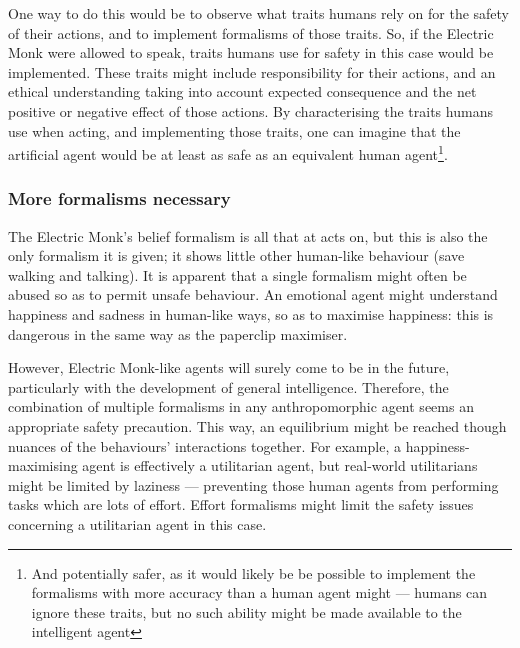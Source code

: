 One way to do this would be to observe what traits humans rely on for the safety of their actions, and to implement formalisms of those traits. So, if the Electric Monk were allowed to speak, traits humans use for safety in this case would be implemented. These traits might include responsibility for their actions, and an ethical understanding taking into account expected consequence and the net positive or negative effect of those actions. By characterising the traits humans use when acting, and implementing those traits, one can imagine that the artificial agent would be at least as safe as an equivalent human agent\footnote{And potentially safer, as it would likely be be possible to implement the formalisms with more accuracy than a human agent might --- humans can ignore these traits, but no such ability might be made available to the intelligent agent}.\par

\subsubsection{More formalisms necessary}
The Electric Monk's belief formalism is all that at acts on, but this is also the only formalism it is given; it shows little other human-like behaviour (save walking and talking). It is apparent that a single formalism might often be abused so as to permit unsafe behaviour. An emotional agent might understand happiness and sadness in human-like ways, so as to maximise happiness: this is dangerous in the same way as the paperclip maximiser.\par

However, Electric Monk-like agents will surely come to be in the future, particularly with the development of general intelligence. Therefore, the combination of multiple formalisms in any anthropomorphic agent seems an appropriate safety precaution. This way, an equilibrium might be reached though nuances of the behaviours' interactions together. For example, a happiness-maximising agent is effectively a utilitarian agent, but real-world utilitarians might be limited by laziness --- preventing those human agents from performing tasks which are lots of effort. Effort formalisms might limit the safety issues concerning a utilitarian agent in this case. \par
